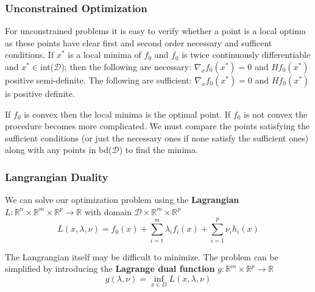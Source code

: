 \documentclass[]{article}
\theoremstyle{mattstyle}
\theoremstyle{definition}
\begin{document}
\subsubsection{Unconstrained Optimization}

For unconstrained problems it is easy to verify whether a point is a local optima as these points have clear first and second order necessary and sufficent conditions. If $x^*$ is a local minima of $f_0$ and $f_0$ is twice continuously differentiable and $x^* \in$int($\mathcal{D}$); then the following are necessary:
$\nabla_{x}f_0(x^*)=0$ and $Hf_{0}(x^*)$ positive semi-definite. The following are sufficient: $\nabla_{x}f_0(x^*)=0$ and $Hf_{0}(x^*)$ is positive definite.

If $f_0$ is convex then the local minima is the optimal point. If $f_0$ is not convex the procedure becomes more complicated. We must compare the points satisfying the sufficient conditions (or just the necessary ones if none satisfy the sufficient ones) along with any points in bd($\mathcal{D}$) to find the minima.

\subsubsection{Langrangian Duality}
We can solve our optimization problem using the \textbf{Lagrangian} $L: \mathbb{R}^n\times \mathbb{R}^m\times \mathbb{R}^p \rightarrow \mathbb{R} $ with domain $\mathcal{D}\times\mathbb{R}^m\times \mathbb{R}^p$
\begin{equation}\label{eq:primal}
L(x,\lambda,\nu) = f_0(x) + \sum_{i=1}^m \lambda_if_i(x) + \sum_{i=1}^p \nu_i h_i(x)
\end{equation}

The Langrangian itself may be difficult to minimize. The problem can be simplified by introducing the \textbf{Lagrange dual function} $g: \mathbb{R}^m\times \mathbb{R}^p \rightarrow \mathbb{R}$
\begin{equation}\label{eq:dual}
g(\lambda,\nu) =\inf\limits_{x\in D} L(x,\lambda,\nu)
\end{equation}
\end{document}
